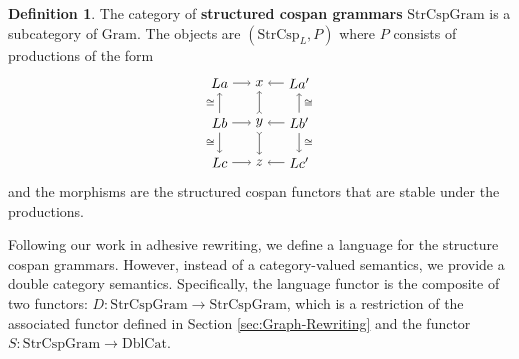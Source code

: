 \documentclass{amsart}
\newcommand{\iso}{\cong}
\newcommand{\DblCat}{\cat{DblCat}}
\newcommand{\Gram}{\cat{Gram}}
\newcommand{\StrCsp}{\cat{StrCsp}}
\newcommand{\StrCspGram}{\cat{StrCspGram}}
\newcommand{\defn}[1]{\textbf{#1}}
\newcommand{\cat}[1]{\mathrm{#1}}
\newcommand{\from}{\colon}
\theoremstyle{remark}
\theoremstyle{definition}
\newtheorem{definition}[theorem]{Definition}
\begin{document}
\begin{definition} \label{def:linear-grammars}
  The category of \defn{structured cospan grammars} $ \StrCspGram $ is
  a subcategory of $ \Gram $.  The objects are $ ( \StrCsp_{L} , P ) $
  where $ P $ consists of productions of the form
  \[
    \begin{tikzpicture}
      \begin{scope}
        \node (1) at (0,2) {\( La \)};
        \node (2) at (1,2) {\( x \)};
        \node (3) at (2,2) {\( La' \)};
        \node (4) at (0,1) {\( Lb \)};
        \node (5) at (1,1) {\( y \)};
        \node (6) at (2,1) {\( Lb' \)};
        \node (7) at (0,0) {\( Lc \)};
        \node (8) at (1,0) {\( z \)};
        \node (9) at (2,0) {\( Lc' \)};
        \draw [->] (1) to node []
          {\scriptsize{\( \)}} (2);
        \draw [->] (3) to node []
          {\scriptsize{\( \)}} (2);
        \draw [->] (4) to node []
          {\scriptsize{\( \)}} (5);
        \draw [->] (6) to node []
          {\scriptsize{\( \)}} (5);
        \draw [->] (7) to node []
          {\scriptsize{\( \)}} (8);
        \draw [->] (9) to node []
          {\scriptsize{\( \)}} (8);
        \draw [->] (4) to node [left]
          {\scriptsize{\( \iso \)}} (1);
        \draw [->] (4) to node [left]
          {\scriptsize{\( \iso \)}} (7);
        \draw [>->] (5) to node []
          {\scriptsize{\( \)}} (2);
        \draw [>->] (5) to node []
          {\scriptsize{\( \)}} (8);
        \draw [->] (6) to node [right]
          {\scriptsize{\( \iso \)}} (3);
        \draw [->] (6) to node [right]
          {\scriptsize{\( \iso \)}} (9);
      \end{scope}
    \end{tikzpicture}
  \]
  and the morphisms are the structured cospan functors that are stable
  under the productions.
\end{definition}

Following our work in adhesive rewriting, we define a language for the
structure cospan grammars. However, instead of a category-valued
semantics, we provide a double category semantics. Specifically, the
language functor is the composite of two functors:
$ D \from \StrCspGram \to \StrCspGram $, which is a restriction of the
associated functor defined in Section \ref{sec:Graph-Rewriting} and
the functor $ S \from \StrCspGram \to \DblCat $.
\end{document}

